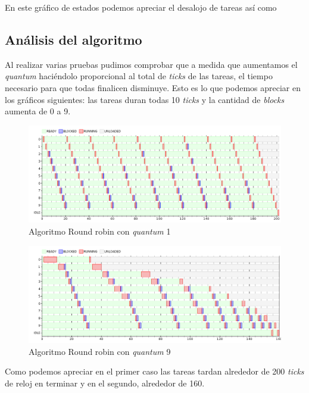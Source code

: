 En este gráfico de estados podemos apreciar el desalojo de tareas así como 

\subsection{Análisis del algoritmo}

Al realizar varias pruebas pudimos comprobar que a medida que aumentamos el \textit{quantum} haciéndolo proporcional al total de \textit{ticks} de las tareas, el tiempo necesario para que todas finalicen disminuye.
Esto es lo que podemos apreciar en los gráficos siguientes: las tareas duran todas 10 \textit{ticks} y la cantidad de \textit{blocks} aumenta de 0 a 9.

\begin{figure}[H]
\centering
\includegraphics[scale=0.4]{./graficos/out_batch_fijo1.png}
\caption{Algoritmo Round robin con \textit{quantum} 1}
\end{figure}  
 
\begin{figure}[H]
\centering
\includegraphics[scale=0.4]{./graficos/out_batch_fijo9.png}
\caption{Algoritmo Round robin con \textit{quantum} 9} 
\end{figure}

Como podemos apreciar en el primer caso las tareas tardan alrededor de 200 \textit{ticks} de reloj en terminar y en el segundo, alrededor de 160. 